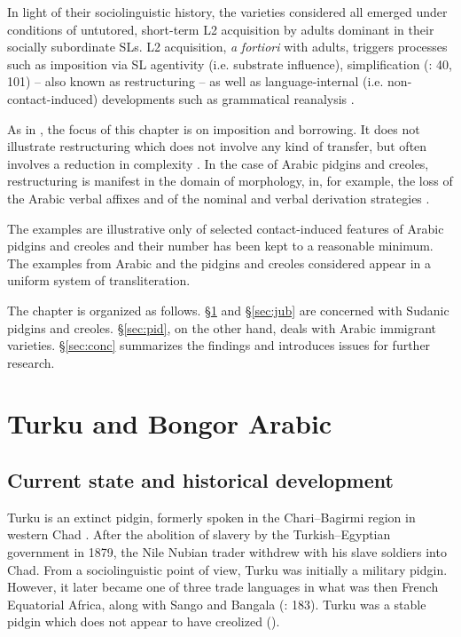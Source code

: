 \documentclass[output=paper]{langsci/langscibook}
\begin{document}
  In light of their sociolinguistic history, the varieties considered all emerged under conditions of untutored, short-term L2 acquisition by adults dominant in their socially subordinate SLs. L2 acquisition, \textit{a} \textit{fortiori} with adults, triggers processes such as imposition via SL agentivity (i.e. substrate influence), simplification (\citealt{Trudgill2011}: 40, 101) – also known as restructuring \citep[529]{Lucas2015} – as well as language-internal (i.e. non-contact-induced) developments such as grammatical reanalysis \citep[415]{Winford2005}.

  As in \citet{Manfredi2018}, the focus of this chapter is on imposition and borrowing. It does not illustrate restructuring which does not involve any kind of transfer, but often involves a reduction in complexity \citep[529]{Lucas2015}. In the case of Arabic pidgins and creoles, restructuring is manifest in the domain of morphology, in, for example, the loss of the Arabic verbal affixes and of the nominal and verbal derivation strategies \citep{Miller1993}.

  The examples are illustrative only of selected contact-induced features of Arabic pidgins and creoles and their number has been kept to a reasonable minimum. The examples from Arabic and the pidgins and creoles considered appear in a uniform system of transliteration.

  The chapter is organized as follows. §\ref{sec:tur} and §\ref{sec:jub} are concerned with Sudanic pidgins and creoles. §\ref{sec:pid}, on the other hand, deals with Arabic immigrant varieties. §\ref{sec:conc} summarizes the findings and introduces issues for further research.


 \section{Turku and Bongor Arabic}\label{sec:tur}


 \subsection{Current state and historical development}


Turku is an extinct pidgin, formerly spoken in the Chari--Bagirmi region in western Chad \citep{Muraz1926}. After the abolition of slavery by the Turkish--Egyptian government in 1879, the Nile Nubian trader  withdrew with his slave soldiers into Chad. From a sociolinguistic point of view, Turku was initially a military pidgin. However, it later became one of three trade languages in what was then French Equatorial Africa, along with Sango and Bangala (\citealt{ToscoOwens1993}: 183). Turku was a stable pidgin which does not appear to have creolized (\citealt{ToscoOwens1993}).
\end{document}
